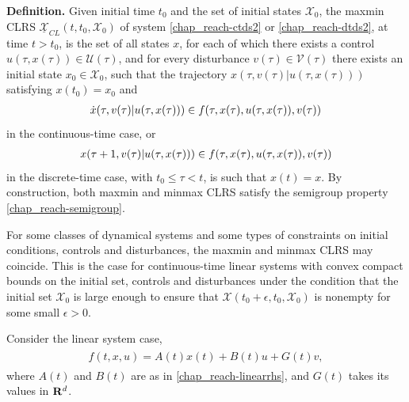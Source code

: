 \documentclass[letterpaper,10pt,english]{sphinxmanual}
\begin{document}
\textbf{Definition.} Given initial time \(t_0\) and the set of initial states \({\mathcal X}_0\), the
maxmin CLRS \(\underline{{\mathcal X}}_{CL}(t, t_0, {\mathcal X}_0)\) of system
\eqref{chap_reach-ctds2} or \eqref{chap_reach-dtds2}, at time \(t>t_0\), is the set of all states
\(x\), for each of which there exists a control
\(u(\tau, x(\tau))\in{\mathcal U}(\tau)\), and for every disturbance
\(v(\tau)\in{\mathcal V}(\tau)\) there exists an initial state
\(x_0\in{\mathcal X}_0\), such that the trajectory
\(x(\tau, v(\tau) | u(\tau, x(\tau)))\) satisfying
\(x(t_0) = x_0\) and
\begin{gather}
\begin{split}\dot{x}(\tau, v(\tau) | u(\tau, x(\tau))) \in
f(\tau, x(\tau), u(\tau, x(\tau)), v(\tau))\end{split}\notag
\end{gather}
in the continuous-time case, or
\begin{gather}
\begin{split}x(\tau+1, v(\tau) | u(\tau, x(\tau))) \in
f(\tau, x(\tau), u(\tau, x(\tau)), v(\tau))\end{split}\notag
\end{gather}
in the discrete-time case, with \(t_0\leqslant\tau<t\), is such
that \(x(t)=x\).
By construction, both
maxmin and minmax CLRS satisfy the semigroup property \eqref{chap_reach-semigroup}.

For some classes of dynamical systems and some types of constraints on
initial conditions, controls and disturbances, the maxmin and minmax
CLRS may coincide. This is the case for continuous-time linear systems
with convex compact bounds on the initial set, controls and disturbances
under the condition that the initial set \({\mathcal X}_0\) is large
enough to ensure that
\({\mathcal X}(t_0+\epsilon, t_0, {\mathcal X}_0)\) is nonempty for
some small \(\epsilon>0\).

Consider the linear system case,
\label{chap_reach:equation-linearrhsdist}\begin{gather}
\begin{split}f(t, x, u) = A(t)x(t) + B(t)u + G(t)v,\end{split}\label{chap_reach-linearrhsdist}
\end{gather}
where \(A(t)\) and \(B(t)\) are as in \eqref{chap_reach-linearrhs}, and
\(G(t)\) takes its values in \({\bf R}^d\).
\end{document}
